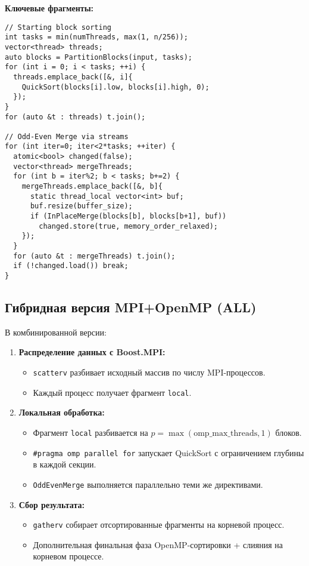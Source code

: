 \documentclass[12pt]{article}
\begin{document}
\noindent\textbf{Ключевые фрагменты:}
\lstset{language=C++}
\begin{lstlisting}
// Starting block sorting
int tasks = min(numThreads, max(1, n/256));
vector<thread> threads;
auto blocks = PartitionBlocks(input, tasks);
for (int i = 0; i < tasks; ++i) {
  threads.emplace_back([&, i]{
    QuickSort(blocks[i].low, blocks[i].high, 0);
  });
}
for (auto &t : threads) t.join();

// Odd-Even Merge via streams
for (int iter=0; iter<2*tasks; ++iter) {
  atomic<bool> changed(false);
  vector<thread> mergeThreads;
  for (int b = iter%2; b < tasks; b+=2) {
    mergeThreads.emplace_back([&, b]{
      static thread_local vector<int> buf;
      buf.resize(buffer_size);
      if (InPlaceMerge(blocks[b], blocks[b+1], buf))
        changed.store(true, memory_order_relaxed);
    });
  }
  for (auto &t : mergeThreads) t.join();
  if (!changed.load()) break;
}
\end{lstlisting}

\subsection{Гибридная версия MPI+OpenMP (ALL)}
\hspace*{1.25em}В комбинированной версии:
\begin{enumerate}
    \item \textbf{Распределение данных с Boost.MPI:}
    \begin{itemize}
        \item \texttt{scatterv} разбивает исходный массив по числу MPI-процессов.
        \item Каждый процесс получает фрагмент \texttt{local}.
    \end{itemize}
    \item \textbf{Локальная обработка:}
    \begin{itemize}
        \item Фрагмент \texttt{local} разбивается на $p = \max(\text{omp\_max\_threads}, 1)$ блоков.
        \item \texttt{\#pragma omp parallel for} запускает QuickSort с ограничением глубины в каждой секции.
        \item \texttt{OddEvenMerge} выполняется параллельно теми же директивами.
    \end{itemize}
    \item \textbf{Сбор результата:}
    \begin{itemize}
        \item \texttt{gatherv} собирает отсортированные фрагменты на корневой процесс.
        \item Дополнительная финальная фаза OpenMP-сортировки + слияния на корневом процессе.
    \end{itemize}
\end{enumerate}
\end{document}
